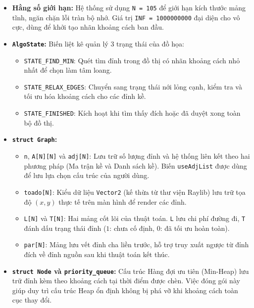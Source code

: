 \documentclass[12pt,a4paper,oneside]{report}
\begin{document}
\begin{itemize}
    \item \textbf{Hằng số giới hạn:} Hệ thống sử dụng \texttt{N = 105} để giới hạn kích thước mảng tĩnh, ngăn chặn lỗi tràn bộ nhớ. Giá trị \texttt{INF = 1000000000} đại diện cho vô cực, dùng để khởi tạo nhãn khoảng cách ban đầu.
    
    \item \textbf{\texttt{AlgoState}:} Biến liệt kê quản lý 3 trạng thái của đồ họa: 
    \begin{itemize}
        \item \texttt{STATE\_FIND\_MIN}: Quét tìm đỉnh trong đồ thị có nhãn khoảng cách nhỏ nhất để chọn làm tâm loang.
        \item \texttt{STATE\_RELAX\_EDGES}: Chuyển sang trạng thái nới lỏng cạnh, kiểm tra và tối ưu hóa khoảng cách cho các đỉnh kề.
        \item \texttt{STATE\_FINISHED}: Kích hoạt khi tìm thấy đích hoặc đã duyệt xong toàn bộ đồ thị.
    \end{itemize}
    
    \item \textbf{\texttt{struct Graph}:} 
    \begin{itemize}
        \item \texttt{n}, \texttt{A[N][N]} và \texttt{adj[N]}: Lưu trữ số lượng đỉnh và hệ thống liên kết theo hai phương pháp (Ma trận kề và Danh sách kề). Biến \texttt{useAdjList} được dùng để lưu lựa chọn cấu trúc của người dùng.
        \item \texttt{toado[N]}: Kiểu dữ liệu \texttt{Vector2} (kế thừa từ thư viện Raylib) lưu trữ tọa độ $(x,y)$ thực tế trên màn hình để render các đỉnh.
        \item \texttt{L[N]} và \texttt{T[N]}: Hai mảng cốt lõi của thuật toán. \texttt{L} lưu chi phí đường đi, \texttt{T} đánh dấu trạng thái đỉnh ($1$: chưa cố định, $0$: đã tối ưu hoàn toàn).
        \item \texttt{par[N]}: Mảng lưu vết đỉnh cha liền trước, hỗ trợ truy xuất ngược từ đỉnh đích về đỉnh nguồn sau khi thuật toán kết thúc.
    \end{itemize}
    
    \item \textbf{\texttt{struct Node} và \texttt{priority\_queue}:} Cấu trúc Hàng đợi ưu tiên (Min-Heap) lưu trữ đỉnh kèm theo khoảng cách tại thời điểm được chèn. Việc đóng gói này giúp duy trì cấu trúc Heap ổn định không bị phá vỡ khi khoảng cách toàn cục thay đổi.
\end{itemize}
\end{document}
